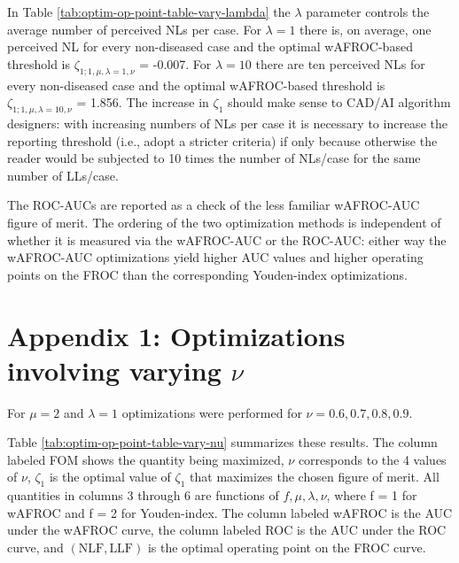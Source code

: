 \documentclass[
]{book}
\begin{document}
In Table \ref{tab:optim-op-point-table-vary-lambda} the \(\lambda\) parameter controls the average number of perceived NLs per case. For \(\lambda = 1\) there is, on average, one perceived NL for every non-diseased case and the optimal wAFROC-based threshold is \(\zeta_{1;1,\mu, \lambda = 1, \nu}\) = -0.007. For \(\lambda = 10\) there are ten perceived NLs for every non-diseased case and the optimal wAFROC-based threshold is \(\zeta_{1;1,\mu, \lambda = 10, \nu}\) = 1.856. The increase in \(\zeta_1\) should make sense to CAD/AI algorithm designers: with increasing numbers of NLs per case it is necessary to increase the reporting threshold (i.e., adopt a stricter criteria) if only because otherwise the reader would be subjected to 10 times the number of NLs/case for the same number of LLs/case.

The ROC-AUCs are reported as a check of the less familiar wAFROC-AUC figure of merit. The ordering of the two optimization methods is independent of whether it is measured via the wAFROC-AUC or the ROC-AUC: either way the wAFROC-AUC optimizations yield higher AUC values and higher operating points on the FROC than the corresponding Youden-index optimizations.

\hypertarget{optim-op-point-vary-nu}{%
\section{\texorpdfstring{Appendix 1: Optimizations involving varying \(\nu\)}{Appendix 1: Optimizations involving varying \textbackslash nu}}\label{optim-op-point-vary-nu}}

For \(\mu = 2\) and \(\lambda = 1\) optimizations were performed for \(\nu = 0.6, 0.7, 0.8, 0.9\).

Table \ref{tab:optim-op-point-table-vary-nu} summarizes these results. The column labeled FOM shows the quantity being maximized, \(\nu\) corresponds to the 4 values of \(\nu\), \(\zeta_1\) is the optimal value of \(\zeta_1\) that maximizes the chosen figure of merit. All quantities in columns 3 through 6 are functions of \(f, \mu, \lambda, \nu\), where f = 1 for wAFROC and f = 2 for Youden-index. The column labeled wAFROC is the AUC under the wAFROC curve, the column labeled ROC is the AUC under the ROC curve, and \(\left( \text{NLF}, \text{LLF}\right)\) is the optimal operating point on the FROC curve.
\end{document}
